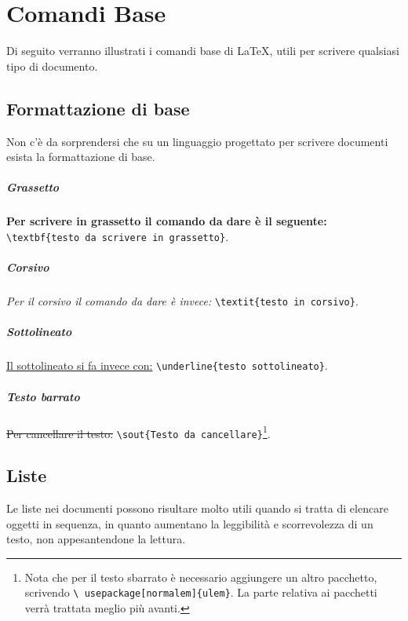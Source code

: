 \chapter{Comandi Base}

Di seguito verranno illustrati i comandi base di \LaTeX{}, utili per scrivere 
qualsiasi tipo di documento.

\section{Formattazione di base}

Non c'è da sorprendersi che su un linguaggio progettato per scrivere documenti 
esista la formattazione di base.

\paragraph*{Grassetto} \textbf{Per scrivere in grassetto il comando da dare è 
il seguente: }\verb!\textbf{testo da scrivere in grassetto}!.

\paragraph*{Corsivo} \textit{Per il corsivo il comando da dare è invece: }
\verb!\textit{testo in corsivo}!.

\paragraph*{Sottolineato} \underline{Il sottolineato si fa invece con:} 
\verb!\underline{testo sottolineato}!.

\paragraph*{Testo barrato} \sout{Per cancellare il testo: }
\verb!\sout{Testo da cancellare}!\footnote{Nota che per il testo sbarrato è 
necessario aggiungere un altro pacchetto, scrivendo \texttt{\textbackslash 
usepackage[normalem]\{ulem\}}. La parte relativa ai pacchetti verrà trattata 
meglio più avanti.}.


\section{Liste}

Le liste nei documenti possono risultare molto utili quando si tratta di 
elencare oggetti in sequenza, in quanto aumentano la leggibilità e 
scorrevolezza di un testo, non appesantendone la lettura.

